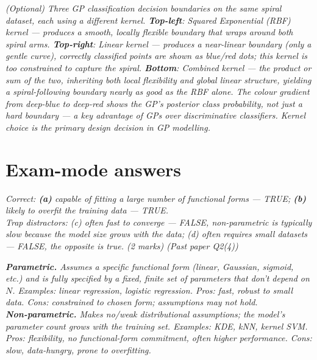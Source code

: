 \documentclass[11pt, a4paper]{article}
\begin{document}
\begin{center}

\footnotesize\textit{(Optional) Three GP classification decision boundaries on the same spiral dataset, each using a different kernel. \textbf{Top-left}: Squared Exponential (RBF) kernel --- produces a smooth, locally flexible boundary that wraps around both spiral arms. \textbf{Top-right}: Linear kernel --- produces a near-linear boundary (only a gentle curve), correctly classified points are shown as blue/red dots; this kernel is too constrained to capture the spiral. \textbf{Bottom}: Combined kernel --- the product or sum of the two, inheriting both local flexibility and global linear structure, yielding a spiral-following boundary nearly as good as the RBF alone. The colour gradient from deep-blue to deep-red shows the GP's posterior class probability, not just a hard boundary --- a key advantage of GPs over discriminative classifiers. Kernel choice is the primary design decision in GP modelling.}
\end{center}

\section{Exam-mode answers}

\begin{exambox}
\textit{Correct: \textbf{(a)} capable of fitting a large number of functional forms — TRUE; \textbf{(b)} likely to overfit the training data — TRUE.}\\[0.3em]
\textit{Trap distractors: (c) often fast to converge — FALSE, non-parametric is typically slow because the model size grows with the data; (d) often requires small datasets — FALSE, the opposite is true. (2 marks) (Past paper Q2(4))}
\end{exambox}

\begin{exambox}
\textit{\textbf{Parametric.} Assumes a specific functional form (linear, Gaussian, sigmoid, etc.) and is fully specified by a fixed, finite set of parameters that don't depend on $N$. Examples: linear regression, logistic regression. Pros: fast, robust to small data. Cons: constrained to chosen form; assumptions may not hold.}\\[0.3em]
\textit{\textbf{Non-parametric.} Makes no/weak distributional assumptions; the model's parameter count grows with the training set. Examples: KDE, kNN, kernel SVM. Pros: flexibility, no functional-form commitment, often higher performance. Cons: slow, data-hungry, prone to overfitting.}
\end{exambox}
\end{document}
